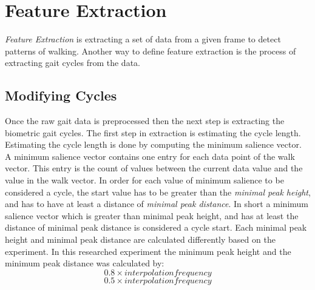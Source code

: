 \documentclass{sig-alternate}
\begin{document}

\section{Feature Extraction}
	\textit{Feature Extraction} is extracting a set of data from a given frame to detect patterns of walking. Another way to define feature extraction is the process of extracting gait cycles from the data.
\subsection{Modifying Cycles}
	Once the raw gait data is preprocessed then the next step is extracting the biometric gait cycles. The first step in extraction is estimating the cycle length. Estimating the cycle length is done by computing the minimum salience vector. A minimum salience vector contains one entry for each data point of the walk vector. This entry is the count of values between the current data value and the value in the walk vector. In order for each value of minimum salience to be considered a cycle, the start value has to be greater than the \textit{minimal peak height}, and has to have at least a distance of \textit{minimal peak distance}. In short a minimum salience vector which is greater than minimal peak height, and has at least the distance of minimal peak distance is considered a cycle start. Each minimal peak height and minimal peak distance are calculated differently based on the experiment. In this researched experiment the minimum peak height and the minimum peak distance was calculated by: \begin{displaymath}0.8 \times interpolation frequency \end{displaymath} \begin{displaymath}0.5 \times interpolation frequency \end{displaymath} 
	
\end{document}

